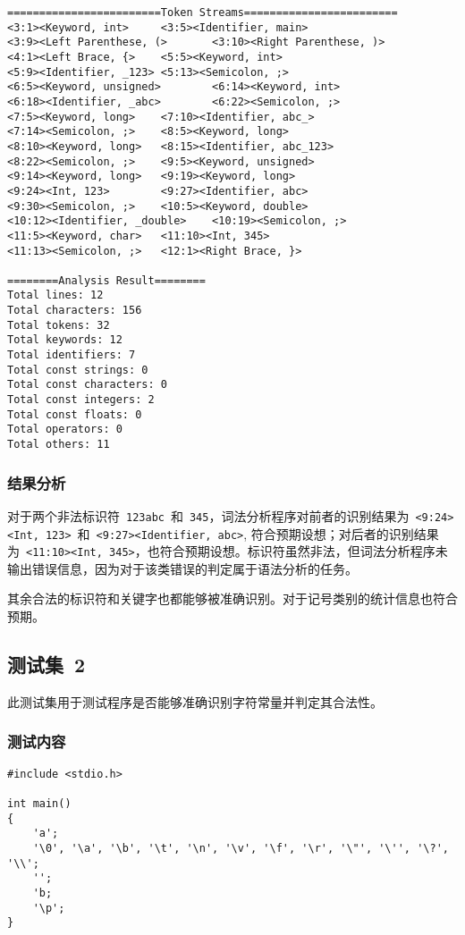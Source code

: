 \documentclass[lang=cn,11pt,a4paper]{paper}
\begin{document}
\begin{lstlisting}
========================Token Streams========================
<3:1><Keyword, int>     <3:5><Identifier, main>
<3:9><Left Parenthese, (>       <3:10><Right Parenthese, )>
<4:1><Left Brace, {>    <5:5><Keyword, int>
<5:9><Identifier, _123> <5:13><Semicolon, ;>
<6:5><Keyword, unsigned>        <6:14><Keyword, int>
<6:18><Identifier, _abc>        <6:22><Semicolon, ;>
<7:5><Keyword, long>    <7:10><Identifier, abc_>
<7:14><Semicolon, ;>    <8:5><Keyword, long>
<8:10><Keyword, long>   <8:15><Identifier, abc_123>
<8:22><Semicolon, ;>    <9:5><Keyword, unsigned>
<9:14><Keyword, long>   <9:19><Keyword, long>
<9:24><Int, 123>        <9:27><Identifier, abc>
<9:30><Semicolon, ;>    <10:5><Keyword, double>
<10:12><Identifier, _double>    <10:19><Semicolon, ;>
<11:5><Keyword, char>   <11:10><Int, 345>
<11:13><Semicolon, ;>   <12:1><Right Brace, }>

========Analysis Result========
Total lines: 12
Total characters: 156
Total tokens: 32
Total keywords: 12
Total identifiers: 7
Total const strings: 0
Total const characters: 0
Total const integers: 2
Total const floats: 0
Total operators: 0
Total others: 11
\end{lstlisting}

\subsubsection{结果分析}

对于两个非法标识符\ \lstinline{123abc}\ 和\ \lstinline{345}，词法分析程序对前者的识别结果为\ \lstinline{<9:24><Int, 123>}\ 和\ \lstinline{<9:27><Identifier, abc>}, 符合预期设想；对后者的识别结果为\ \lstinline{<11:10><Int, 345>}，也符合预期设想。标识符虽然非法，但词法分析程序未输出错误信息，因为对于该类错误的判定属于语法分析的任务。

其余合法的标识符和关键字也都能够被准确识别。对于记号类别的统计信息也符合预期。

\subsection{测试集\ 2}

此测试集用于测试程序是否能够准确识别字符常量并判定其合法性。

\subsubsection{测试内容}

\begin{lstlisting}
#include <stdio.h>

int main()
{
    'a';
    '\0', '\a', '\b', '\t', '\n', '\v', '\f', '\r', '\"', '\'', '\?', '\\';
    '';
    'b;
    '\p';
}
\end{lstlisting}
\end{document}
